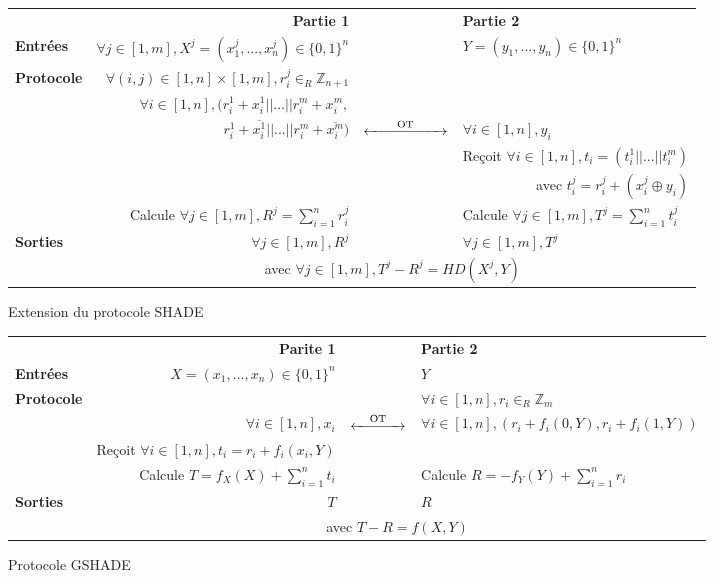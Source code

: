 \documentclass{article}
\begin{document}
\begin{figure}[h]
\centering
\begin{tabular}{|lrcl|}
\hline
 & \textbf{Partie 1} & & \textbf{Partie 2}\\
\textbf{Entrées} & $\forall j \in [1, m], X^j =(x_1^j, ..., x_n^j) \in \{0, 1\}^n$ & & $Y =(y_1, ..., y_n) \in \{0, 1\}^n$\\
\textbf{Protocole} & $\forall (i,j) \in [1, n] \times[1,m], r_i^j \in_R \mathbb{Z}_{n+1}$ & & \\
 & $\forall i \in [1, n], (r_i^1+x_i^1 || ... || r_i^m+x_i^m,$  & &  \\
 & $ r_i^1 + \overline{x_i^1} || ... || r_i^m + \overline{x_i^m} )$ & $\xleftrightarrow{\hspace{2em} \text{OT}\hspace{2em} }$ & $\forall i \in [1,n], y_i$\\
 & & & Reçoit $\forall i \in [1,n], t_i = (t_i^1 || ... || t_i^m)$\\
\multicolumn{4}{|r|}{avec $t_i^j= r_i^j + (x_i^j \oplus y_i)$} \\
 & Calcule $\forall j \in [1,m], R^j = \sum_{i=1}^n r_i^j$ & & Calcule $\forall j \in [1,m], T^j = \sum_{i=1}^n t_i^j$ \\
\textbf{Sorties} & $\forall j \in [1, m], R^j$ & & $\forall j \in [1, m], T^j$ \\
 & \multicolumn{3}{c|}{avec $\forall j \in [1,m], T^j - R^j = HD(X^j, Y)$} \\
\hline
\end{tabular}
\captionsetup{labelformat=empty}
\caption{Extension du protocole SHADE}
\end{figure}

\begin{figure}[h]
\centering
\begin{tabular}{|lrcl|}
\hline
 & \textbf{Parite 1} & & \textbf{Partie 2}\\
\textbf{Entrées} & $X =(x_1, ..., x_n) \in \{0, 1\}^n$ & & $Y$\\
\textbf{Protocole} & & & $\forall i \in [1, n], r_i \in_R \mathbb{Z}_{m}$ \\
 & $\forall i \in [1, n], x_i$ & $\xleftrightarrow{\hspace{1em} \text{OT}\hspace{1em} }$ & $\forall i \in [1,n], (r_i + f_i(0, Y), r_i + f_i(1, Y))$ \\
 & Reçoit $\forall i \in [1,n], t_i = r_i + f_i(x_i, Y)$ & & \\
 & Calcule $T = f_X(X) + \sum_{i=1}^n t_i$ & & Calcule $R = -f_Y(Y) + \sum_{i=1}^n r_i$ \\
\textbf{Sorties} & $T$ & & $R$ \\
 & \multicolumn{3}{c|}{avec $T-R = f(X, Y)$} \\
\hline
\end{tabular}
\captionsetup{labelformat=empty}
\caption{Protocole GSHADE}
\end{figure}
\end{document}

